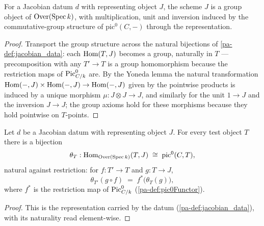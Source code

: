 \begin{definition}
  \label{pa-def:jacobian_data_grp}
  \leanok

  For a Jacobian datum \(d\) with representing object \(J\), the scheme \(J\)
  is a group object of \(\mathrm{Over}(\operatorname{Spec} k)\), with multiplication, unit and
  inversion induced by the commutative-group structure of
  \(\mathrm{pic}^0(C, -)\) through the representation.
\end{definition}
\begin{proof}
  \leanok
  Transport the group structure across the natural bijections of
  \ref{pa-def:jacobian_data}: each \(\operatorname{Hom}(T, J)\) becomes a group, naturally in
  \(T\) --- precomposition with any \(T' \to T\) is a group homomorphism
  because the restriction maps of \(\operatorname{Pic}^0_{C/k}\) are. By the Yoneda lemma the
  natural transformation
  \(\operatorname{Hom}(-, J) \times \operatorname{Hom}(-, J) \to \operatorname{Hom}(-, J)\) given by the pointwise
  products is induced by a unique morphism \(\mu : J \otimes J \to J\), and
  similarly for the unit \(1 \to J\) and the inversion \(J \to J\); the group
  axioms hold for these morphisms because they hold pointwise on
  \(T\)-points.
\end{proof}

\begin{lemma}
  \label{pa-lem:jacobian_data_homEquiv}
  \leanok

  Let \(d\) be a Jacobian datum with representing object \(J\). For every test
  object \(T\) there is a bijection
  \[
    \theta_T : \operatorname{Hom}_{\mathrm{Over}(\operatorname{Spec} k)}(T, J) \;\cong\; \mathrm{pic}^0(C, T),
  \]
  natural against restriction: for \(f : T' \to T\) and \(g : T \to J\),
  \[
    \theta_{T'}(g \circ f) \;=\; f^*\bigl(\theta_T(g)\bigr),
  \]
  where \(f^*\) is the restriction map of \(\operatorname{Pic}^0_{C/k}\)
  (\ref{pa-def:pic0Functor}).
\end{lemma}
\begin{proof}
  \leanok
  This is the representation carried by the datum (\ref{pa-def:jacobian_data}),
  with its naturality read element-wise.
\end{proof}

